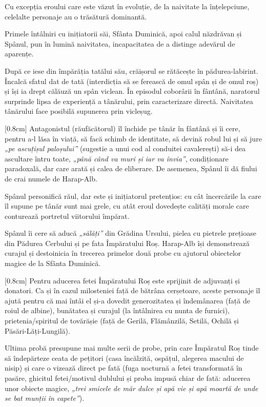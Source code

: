 \documentclass[
12pt,
a4paper
]{article}
\begin{document}
Cu excepția eroului care este văzut în evoluție, de la naivitate la înțelepciune, celelalte personaje au o trăsătură dominantă.

Primele întâlniri cu inițiatorii săi, Sfânta Duminică, apoi calul năzdrăvan și Spânul, pun în lumină naivitatea, incapacitatea de a distinge adevărul de aparențe.

După ce iese din împărăția tatălui său, crăișorul se rătăcește în pădurea-labirint. Încalcă sfatul dat de tată (interdicția să se ferească de omul spân și de omul roș) și își ia drept călăuză un spân viclean. În episodul coborârii în fântână, naratorul surprinde lipsa de experiență a tânărului, prin caracterizare directă. Naivitatea tânărului face posibilă supunerea prin vicleșug.

[0.8cm]
Antagonistul (răufăcătorul) îl închide pe tânăr în fântână și îi cere, pentru a-l lăsa în viață, să facă schimb de identitate, să devină robul lui și să jure \textit{„pe ascuțișul paloșului”} (sugestie a unui cod al conduitei cavalerești) să-i dea ascultare întru toate, \textit{„până când va muri și iar va învia”}, condiționare paradoxală, dar care arată și calea de eliberare. De asemenea, Spânul îi dă fiului de crai numele de Harap-Alb.

Spânul personifică răul, dar este și inițiatorul pretențios: cu cât încercările la care îl supune pe tânăr sunt mai grele, cu atât eroul dovedește calități morale care conturează portretul viitorului împărat.

Spânul îi cere să aducă \textit{„sălăți”} din Grădina Ursului, pielea cu pietrele prețioase din Pădurea Cerbului și pe fata Împăratului Roș. Harap-Alb își demonstrează curajul și destoinicia în trecerea primelor două probe cu ajutorul obiectelor magice de la Sfânta Duminică.

[0.8cm]
Pentru aducerea fetei Împăratului Roș este sprijinit de adjuvanți și donatori. Ca și în cazul milosteniei față de bătrâna cerșetoare, aceste personaje îl ajută pentru că mai întâi el și-a dovedit generozitatea și îndemânarea (față de roiul de albine), bunătatea și curajul (la întâlnirea cu nunta de furnici), prietenia/spiritul de tovărășie (față de Gerilă, Flămânzilă, Setilă, Ochilă și Păsări-Lăți-Lungilă).

Ultima probă presupune mai multe serii de probe, prin care Împăratul Roș tinde să îndepărteze ceata de pețitori (casa încălzită, ospățul, alegerea macului de nisip) și care o vizează direct pe fată (fuga nocturnă a fetei transformată în pasăre, ghicitul fetei/motivul dublului și proba impusă chiar de fată: aducerea unor obiecte magice, \textit{„trei smicele de măr dulce și apă vie și apă moartă de unde se bat munții în capete”}).
\end{document}
